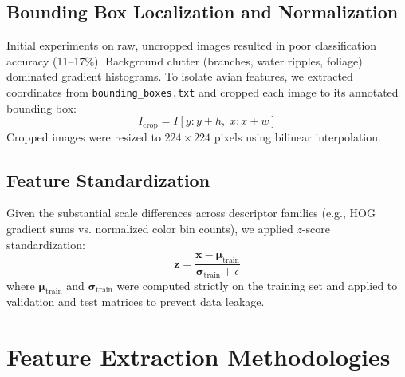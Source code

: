 \documentclass[conference]{IEEEtran}
\begin{document}
\subsection{Bounding Box Localization and Normalization}
Initial experiments on raw, uncropped images resulted in poor classification accuracy (11–17\%). Background clutter (branches, water ripples, foliage) dominated gradient histograms. To isolate avian features, we extracted coordinates from \texttt{bounding\_boxes.txt} and cropped each image to its annotated bounding box:
\begin{equation}
I_{\text{crop}} = I[y : y + h, \; x : x + w]
\end{equation}
Cropped images were resized to $224 \times 224$ pixels using bilinear interpolation.

\subsection{Feature Standardization}
Given the substantial scale differences across descriptor families (e.g., HOG gradient sums vs. normalized color bin counts), we applied $z$-score standardization:
\begin{equation}
\mathbf{z} = \frac{\mathbf{x} - \boldsymbol{\mu}_{\text{train}}}{\boldsymbol{\sigma}_{\text{train}} + \epsilon}
\end{equation}
where $\boldsymbol{\mu}_{\text{train}}$ and $\boldsymbol{\sigma}_{\text{train}}$ were computed strictly on the training set and applied to validation and test matrices to prevent data leakage.

\section{Feature Extraction Methodologies}
\label{sec:features}
\end{document}
